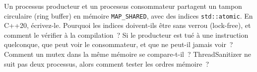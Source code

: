 \begin{question}\label{iq:iv3:operating-systems-concurrency-and-networks:40}
Un processus producteur et un processus consommateur partagent un tampon circulaire (ring buffer) en mémoire \texttt{MAP\_SHARED}, avec des indices \texttt{std::atomic}. En C++20, écrivez-le. Pourquoi les indices doivent-ils être sans verrou (lock-free), et comment le vérifier à la compilation~? Si le producteur est tué à une instruction quelconque, que peut voir le consommateur, et que ne peut-il jamais voir~? Comment un mutex dans la même mémoire se compare-t-il~? ThreadSanitizer ne suit pas deux processus, alors comment tester les ordres mémoire~?
\end{question}
